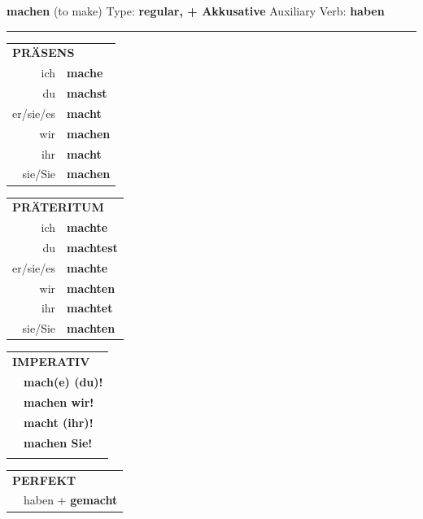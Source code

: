 \documentclass[10pt,a4paper]{revtex4-2}
\begin{document}
\begin{verbbox-acc}
    {\Large \bf machen} (to make) \hfill Type: \textbf{regular, + Akkusative} \hfill Auxiliary Verb: \textbf{haben} 
    
     \vspace{5pt}

    \hrule
    
    \vspace{5pt}

  \begin{tabular}{rl}
     \multicolumn{2}{l}{\textbf{PRÄSENS} }\\
    ich & \textbf{mache}\\
    du & \textbf{machst}\\
    er/sie/es & \textbf{macht}\\
    wir & \textbf{machen}\\
    ihr & \textbf{macht}\\
    sie/Sie & \textbf{machen}\\
  \end{tabular}
  \hfill
     \begin{tabular}{rl}
    \multicolumn{2}{l}{\textbf{PRÄTERITUM} }\\
    ich & \textbf{machte}\\
    du & \textbf{machtest}\\
    er/sie/es & \textbf{machte}\\
    wir & \textbf{machten}\\
    ihr & \textbf{machtet}\\
    sie/Sie & \textbf{machten}\\
  \end{tabular}
  \hfill
  \begin{tabular}{rl}
     \multicolumn{2}{l}{\textbf{IMPERATIV} }\\
   & \textbf{mach(e) (du)!}\\
   & \textbf{machen wir!}\\
   & \textbf{macht (ihr)!}\\
   & \textbf{machen Sie!}\\
   & \vspace{10pt}
  \end{tabular}

    \vspace{10pt}

 \begin{tabular}{rl}
     \multicolumn{2}{l}{\textbf{PERFEKT}}\\
   & haben + \textbf{gemacht}\\
  \end{tabular}
\hfill
   \begin{tabular}{rl}
   

\end{tabular}
\end{verbbox-acc}
\end{document}
